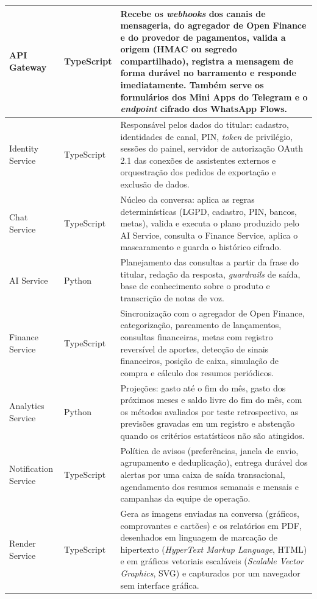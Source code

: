 {\begin{longtable}{|L{3.4cm}|L{1.9cm}|L{9.2cm}|}
API Gateway & TypeScript & Recebe os \textit{webhooks} dos canais de mensageria, do agregador de Open Finance e do provedor de pagamentos, valida a origem (HMAC ou segredo compartilhado), registra a mensagem de forma durável no barramento e responde imediatamente. Também serve os formulários dos Mini Apps do Telegram e o \textit{endpoint} cifrado dos WhatsApp Flows. \\ \hline
Identity Service & TypeScript & Responsável pelos dados do titular: cadastro, identidades de canal, PIN, \textit{token} de privilégio, sessões do painel, servidor de autorização OAuth 2.1 das conexões de assistentes externos e orquestração dos pedidos de exportação e exclusão de dados. \\ \hline
Chat Service & TypeScript & Núcleo da conversa: aplica as regras determinísticas (LGPD, cadastro, PIN, bancos, metas), valida e executa o plano produzido pelo AI Service, consulta o Finance Service, aplica o mascaramento e guarda o histórico cifrado. \\ \hline
AI Service & Python & Planejamento das consultas a partir da frase do titular, redação da resposta, \textit{guardrails} de saída, base de conhecimento sobre o produto e transcrição de notas de voz. \\ \hline
Finance Service & TypeScript & Sincronização com o agregador de Open Finance, categorização, pareamento de lançamentos, consultas financeiras, metas com registro reversível de aportes, detecção de sinais financeiros, posição de caixa, simulação de compra e cálculo dos resumos periódicos. \\ \hline
Analytics Service & Python & Projeções: gasto até o fim do mês, gasto dos próximos meses e saldo livre do fim do mês, com os métodos avaliados por teste retrospectivo, as previsões gravadas em um registro e abstenção quando os critérios estatísticos não são atingidos. \\ \hline
Notification Service & TypeScript & Política de avisos (preferências, janela de envio, agrupamento e deduplicação), entrega durável dos alertas por uma caixa de saída transacional, agendamento dos resumos semanais e mensais e campanhas da equipe de operação. \\ \hline
Render Service & TypeScript & Gera as imagens enviadas na conversa (gráficos, comprovantes e cartões) e os relatórios em PDF, desenhados em linguagem de marcação de hipertexto (\textit{HyperText Markup Language}, HTML) e em gráficos vetoriais escaláveis (\textit{Scalable Vector Graphics}, SVG) e capturados por um navegador sem interface gráfica. \\ \hline

\end{longtable}}
